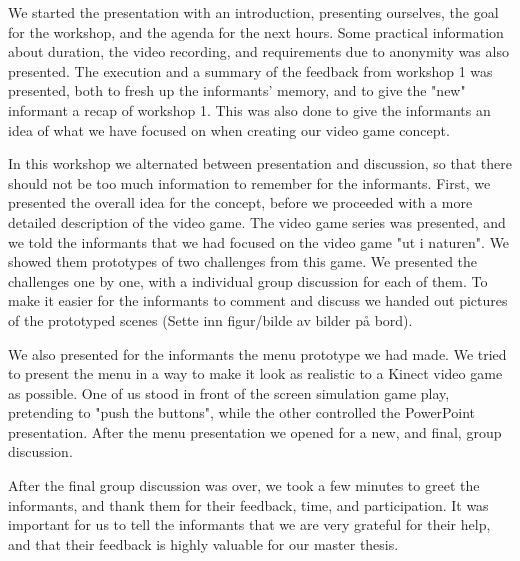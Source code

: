 We started the presentation with an introduction, presenting ourselves, the goal for the workshop, and the agenda for the next hours. Some practical information about duration, the video recording, and requirements due to anonymity was also presented. The execution and a summary of the feedback from workshop 1 was presented, both to fresh up the informants' memory, and to give the "new" informant a recap of workshop 1. This was also done to give the informants an idea of what we have focused on when creating our video game concept.        

In this workshop we alternated between presentation and discussion, so that there should not be too much information to remember for the informants. First, we presented the overall idea for the concept, before we proceeded with a more detailed description of the video game. The video game series was presented, and we told the informants that we had focused on the video game "ut i naturen". We showed them prototypes of two challenges from this game. We presented the challenges one by one, with a individual group discussion for each of them. To make it easier for the informants to comment and discuss we handed out pictures of the prototyped scenes (Sette inn figur/bilde av bilder på bord). 

We also presented for the informants the menu prototype we had made. We tried to present the menu in a way to make it look as realistic to a Kinect video game as possible. One of us stood in front of the screen simulation game play, pretending to "push the buttons", while the other controlled the PowerPoint presentation.  After the menu presentation we opened for a new, and final, group discussion. 

After the final group discussion was over, we took a few minutes to greet the informants, and thank them for their feedback, time, and participation. It was important for us to tell the informants that we are very grateful for their help, and that their feedback is highly valuable for our master thesis.    

 